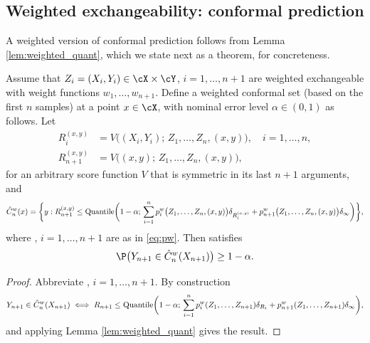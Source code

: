 \documentclass{article}
\begin{document}
\subsection{Weighted exchangeability: conformal prediction}

\def\hC{\hat{C}}

A weighted version of conformal prediction follows from Lemma
\ref{lem:weighted_quant}, which we state next as a theorem, for concreteness. 

\begin{theorem}
\label{thm:weighted_conf}
Assume that $Z_i=(X_i,Y_i) \in \cX \times \cY$, $i=1,\dots,n+1$ are weighted   
exchangeable with weight functions $w_1,\dots,w_{n+1}$. Define a weighted
conformal set (based on the first $n$ samples) at a point $x \in \cX$, with
nominal error level $\alpha \in (0,1)$ as follows. Let   
\begin{equation}
\label{eq:scores}
\begin{aligned}
R_i^{(x,y)} &= V\Big( (X_i,Y_i); \, Z_1,\dots,Z_n,(x,y)\Big), \quad
i=1,\dots,n, \\ 
R_{n+1}^{(x,y)} &= V\Big( (x,y); \, Z_1,\dots,Z_n,(x,y) \Big), 
\end{aligned}
\end{equation}
for an arbitrary score function $V$ that is symmetric in its last $n+1$
arguments, and 
\begin{equation}
\label{eq:weighted_conf}
\hC^w_n(x) = \bigg\{ y : R_{n+1}^{(x,y)} \leq \Quantile\bigg( 1-\alpha; 
\, \sum_{i=1}^n p^w_i\big( Z_1,\dots,Z_n,(x,y) \big) \delta_{R_i^{(x,y)}} + 
p^w_{n+1}\big( Z_1,\dots,Z_n,(x,y) \big) \delta_\infty \bigg) \bigg\},  
\end{equation}
where , $i=1,\dots,n+1$ are as in \eqref{eq:pw}. Then
\smash{$\hC^w_n$} satisfies     
\begin{equation}
\label{eq:weighted_cov}
\P\big( Y_{n+1} \in \hC^w_n(X_{n+1}) \big) \geq 1-\alpha.  
\end{equation}
\end{theorem}

\begin{proof}
Abbreviate , $i=1,\dots,n+1$. By
construction 
\[
Y_{n+1} \in \hC^w_n(X_{n+1}) \iff 
R_{n+1} \leq \Quantile\bigg( 1-\alpha; \, \sum_{i=1}^n p^w_i(Z_1,\dots,Z_{n+1}) 
\delta_{R_i} + p^w_{n+1}(Z_1,\dots,Z_{n+1}) \delta_\infty \bigg),
\]
and applying Lemma \ref{lem:weighted_quant} gives the result.  
\end{proof}
\end{document}
